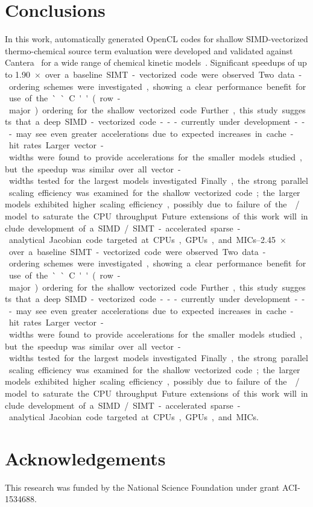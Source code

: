 \documentclass[12pt,number,sort&compress]{elsarticle}
\begin{document}
\section{Conclusions}
In this work, automatically generated OpenCL codes for shallow SIMD-vectorized thermo-chemical source term evaluation were developed and validated against Cantera~\cite{Cantera} for a wide range of chemical kinetic models~\cite{Burke:2011fh,smith_gri-mech_30,Wang:2007,Sarathy:2013jr}.
Significant speedups of up to \SIrange{1.90}{2.45}{$\times$} over a baseline SIMT-vectorized code were observed.
Two data-ordering schemes were investigated, showing a clear performance benefit for use of the ``C'' (row-major) ordering for the shallow vectorized code.
Further, this study suggests that a deep SIMD-vectorized code---currently under development---may see even greater accelerations due to expected increases in cache-hit rates.
Larger vector-widths were found to provide accelerations for the smaller models studied, but the speedup was similar over all vector-widths tested for the largest models investigated.
Finally, the strong parallel scaling efficiency was examined for the shallow vectorized code; the larger models exhibited higher scaling efficiency, possibly due to failure of the \slash{} model to saturate the CPU throughput.
Future extensions of this work will include development of a SIMD\slash SIMT-accelerated sparse-analytical Jacobian code targeted at CPUs, GPUs, and MICs.

\section{Acknowledgements}
This research was funded by the National Science Foundation under grant ACI-1534688.


\end{document}

